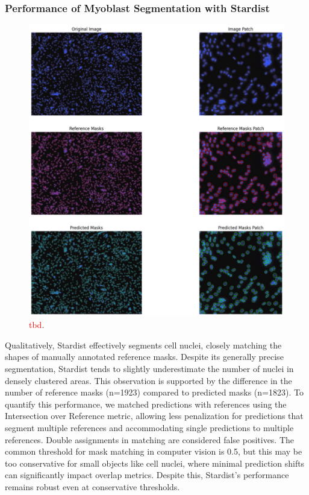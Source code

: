 \subsubsection{Performance of Myoblast Segmentation with Stardist}

\begin{figure}
	\centering
	\includegraphics[width=\textwidth]{"images/qualitative_performance_stardist.png"}
	\caption[Qualitative performance \texttt{Stardist}]{\textcolor{red}{tbd}.}
	\label{figperfstardistqual}
\end{figure} 

Qualitatively, Stardist effectively segments cell nuclei, closely matching the shapes of manually annotated reference masks. Despite its generally precise segmentation, Stardist tends to slightly underestimate the number of nuclei in densely clustered areas. This observation is supported by the difference in the number of reference masks (n=1923) compared to predicted masks (n=1823). To quantify this performance, we matched predictions with references using the Intersection over Reference metric, allowing less penalization for predictions that segment multiple references and accommodating single predictions to multiple references. Double assignments in matching are considered false positives.
The common threshold for mask matching in computer vision is 0.5, but this may be too conservative for small objects like cell nuclei, where minimal prediction shifts can significantly impact overlap metrics. Despite this, Stardist's performance remains robust even at conservative thresholds.


